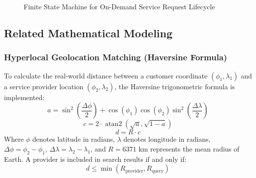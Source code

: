\begin{figure}[h!]
\centering
\begin{center}
\end{center}
\caption{Finite State Machine for On-Demand Service Request Lifecycle}\label{fig:fsm_diagram}
\end{figure}

\subsection{Related Mathematical Modeling}
\subsubsection{Hyperlocal Geolocation Matching (Haversine Formula)}
To calculate the real-world distance between a customer coordinate $(\phi_1, \lambda_1)$ and a service provider location $(\phi_2, \lambda_2)$, the Haversine trigonometric formula is implemented:
\begin{equation}
a = \sin^2\left(\frac{\Delta \phi}{2}\right) + \cos(\phi_1)\cos(\phi_2)\sin^2\left(\frac{\Delta \lambda}{2}\right)
\end{equation}
\begin{equation}
c = 2 \cdot \operatorname{atan2}\left(\sqrt{a}, \sqrt{1-a}\right)
\end{equation}
\begin{equation}
d = R \cdot c
\end{equation}
Where $\phi$ denotes latitude in radians, $\lambda$ denotes longitude in radians, $\Delta \phi = \phi_2 - \phi_1$, $\Delta \lambda = \lambda_2 - \lambda_1$, and $R = 6371\text{ km}$ represents the mean radius of Earth. A provider is included in search results if and only if:
\begin{equation}
d \le \min(R_{\text{provider}}, R_{\text{query}})
\end{equation}

